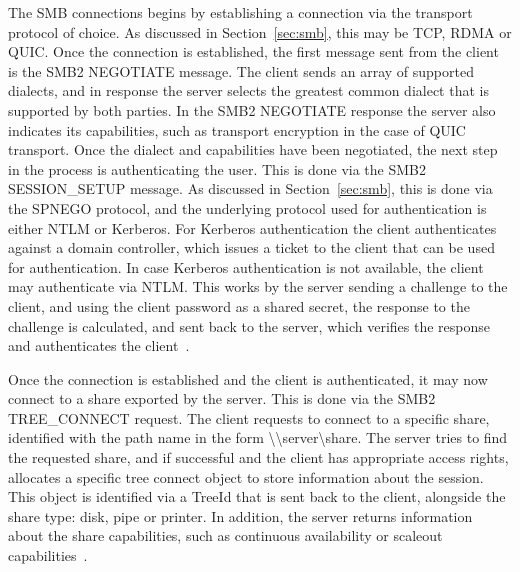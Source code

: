 \documentclass[english, 12pt, a4paper, elec, utf8, a-2b, online]{aaltothesis}
\begin{document}
The SMB connections begins by establishing a connection via the transport protocol
of choice. As discussed in Section~\ref{sec:smb}, this may be TCP, RDMA or QUIC.
Once the connection is established, the first message sent from the client is
the SMB2 NEGOTIATE message. The client sends an array of supported dialects,
and in response the server selects the greatest common dialect that is supported
by both parties. In the SMB2 NEGOTIATE response the server also indicates its capabilities,
such as transport encryption in the case of QUIC transport. Once the dialect and
capabilities have been negotiated, the next step in the process is authenticating
the user. This is done via the SMB2 SESSION\_SETUP message. As discussed in Section~\ref{sec:smb},
this is done via the SPNEGO protocol, and the underlying protocol used for authentication
is either NTLM or Kerberos. For Kerberos authentication the client authenticates
against a domain controller, which issues a ticket to the client that can be used for
authentication. In case Kerberos authentication is not available, the client may
authenticate via NTLM. This works by the server sending a challenge to the client,
and using the client password as a shared secret, the response to the challenge is
calculated, and sent back to the server, which verifies the response and authenticates
the client~\cite{smb2_tech}.

Once the connection is established and the client is authenticated, it may now connect
to a share exported by the server. This is done via the SMB2 TREE\_CONNECT request.
The client requests to connect to a specific share, identified with the path name
in the form {\textbackslash\textbackslash}server{\textbackslash}share. The server
tries to find the requested share, and if successful and the client has appropriate
access rights, allocates a specific tree connect object to store information about the session.
This object is identified via a TreeId that is sent back to the client, alongside
the share type: disk, pipe or printer. In addition,
the server returns information about the share capabilities, such as continuous availability
or scaleout capabilities~\cite{smb2_tech}.
\end{document}
